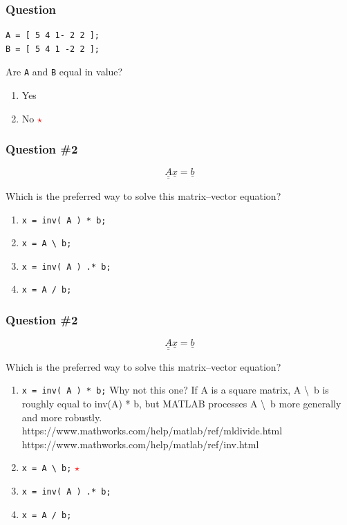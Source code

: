 \documentclass[11pt]{beamer}
\newcommand{\correctstar}{{\Large\textcolor{red}{$\star$}}}
\begin{document}
\begin{frame}[fragile]
  \frametitle{Question}
  \Enlarge

  \begin{Verbatim}
A = [ 5 4 1- 2 2 ];
B = [ 5 4 1 -2 2 ];
  \end{Verbatim}

Are \texttt{A} and \texttt{B} equal in value?

  \begin{enumerate}[label=\Alph*]
    \item  Yes
    \item  No  \correctstar
  \end{enumerate}
\end{frame}


\begin{frame}[fragile]
  \frametitle{Question \#2}
  \Enlarge

  $$
\underline{\underline{A}} \underline{x} = \underline{b}
  $$

Which is the preferred way to solve this matrix--vector equation?

  \begin{enumerate}[label=\Alph*]
    \item  \texttt{x = inv( A ) * b;}
    \item  \texttt{x = A \textbackslash ~b;}
    \item  \texttt{x = inv( A ) .* b;}
    \item  \texttt{x = A / b;}
  \end{enumerate}
\end{frame}

\begin{frame}[fragile]
  \frametitle{Question \#2}

  $$
\underline{\underline{A}} \underline{x} = \underline{b}
  $$

Which is the preferred way to solve this matrix--vector equation?

  \begin{enumerate}[label=\Alph*]
    \item  \texttt{x = inv( A ) * b;}  Why not this one?
    If A is a square matrix, A \textbackslash ~b is roughly equal to inv(A) * b, but MATLAB processes  A \textbackslash ~b more generally and more robustly. https://www.mathworks.com/help/matlab/ref/mldivide.html
    https://www.mathworks.com/help/matlab/ref/inv.html
    \item  \texttt{x = A \textbackslash ~b;}  \correctstar
    \item  \texttt{x = inv( A ) .* b;}
    \item  \texttt{x = A / b;}
  \end{enumerate}
\end{frame}
\end{document}

